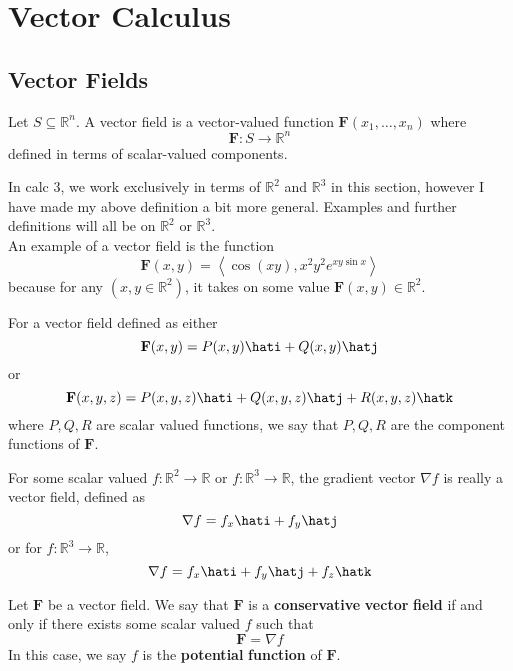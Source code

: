 \chapter{Vector Calculus}
\section{Vector Fields}
\begin{definition}
    Let \(S \subseteq \mathbb{R} ^n\). A vector field is a vector-valued function \(\mathbf{F}(x_1,\ldots,x_n)\) where
    \[
        \mathbf{F}:S\to \mathbb{R}^n
    \]
    defined in terms of scalar-valued components.
\end{definition}
In calc 3, we work exclusively in terms of \(\mathbb{R}^2\) and \(\mathbb{R} ^3\) in this section, however I have made my above definition a bit more general. Examples and further definitions will all be on \(\mathbb{R} ^2\) or \(\mathbb{R} ^3\).\\
An example of a vector field is the function 
\[
    \mathbf{F} (x,y)=\left\langle \cos (xy),x^2 y^2 e^{xy\sin x}  \right\rangle
\]
because for any \((x,y\in\mathbb{R}^2)\), it takes on some value \(\mathbf{F}(x,y)\in\mathbb{R}^2\).
\begin{definition}
    For a vector field defined as either 
    \[
        \mathbf{F}(x,y) =P(x,y)\hati +Q(x,y)\hatj
    \]
    or
    \[
        \mathbf{F}(x,y,z)=P(x,y,z)\hati+Q(x,y,z)\hatj+R(x,y,z)\hatk
    \]
    where \(P,Q,R\) are scalar valued functions, we say that \(P,Q,R\) are the component functions of \(\mathbf{F} \).
\end{definition}
\begin{remark}
    For some scalar valued \(f:\mathbb{R} ^2 \to \mathbb{R} \) or \(f:\mathbb{R}^3 \to \mathbb{R} \), the gradient vector \(\nabla f\) is really a vector field, defined as 
    \[
        \nabla f = f_x\hati +f_y\hatj
    \]
    or for \(f:\mathbb{R} ^3\to \mathbb{R} \),
    \[
        \nabla f = f_x\hati+f_y\hatj+f_z\hatk
    \]
\end{remark}
\begin{definition}
    Let \(\mathbf{F} \) be a vector field. We say that \(\mathbf{F} \) is a \textbf{conservative} \textbf{vector} \textbf{field} if and only if there exists some scalar valued \(f\) such that
    \[
        \mathbf{F} =\nabla f
    \]
    In this case, we say \(f\) is the \textbf{potential} \textbf{function} of \(\mathbf{F} \).
\end{definition}
